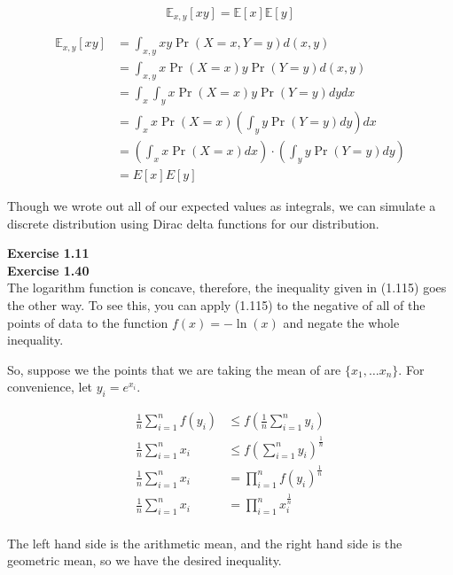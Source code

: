 \documentclass{article}
\newcommand{\E}{\mathbb{E}}
\begin{document}
\[
\E_{x,y} [xy] = \E[x]\E[y]
\]


\begin{align*}
\E_{x,y}[xy] &= \int_{x,y} xy \Pr(X=x,Y=y) d(x,y)\\
&= \int_{x,y} x \Pr(X=x) y \Pr(Y=y) d(x,y)\\
&= \int_x \int _y x \Pr(X=x) y \Pr(Y=y) dy dx \\
&= \int_x x \Pr(X=x) \left(\int _y  y \Pr(Y=y) dy\right) dx \\
&= \left(\int_x x \Pr(X=x) dx \right) \cdot \left(\int _y  y \Pr(Y=y) dy\right) \\
&= E[x] E[y]
\end{align*}

Though we wrote out all of our expected values as integrals, we can simulate a discrete distribution using Dirac delta functions for our distribution.

\noindent\textbf{Exercise 1.11}\\


\noindent\textbf{Exercise 1.40}\\

The logarithm function is concave, therefore, the inequality given in (1.115) goes the other way. To see this, you can apply (1.115) to the negative of all of the points of data to the function $f(x) = -\ln(x)$ and negate the whole inequality.

So, suppose we the points that we are taking the mean of are $\{x_1,\ldots x_n\}$. For convenience, let $y_i = e^{x_i}$.

\begin{align*}
\frac{1}{n}\sum_{i=1}^n f(y_i) &\le f( \frac{1}{n} \sum_{i=1}^n y_i) \\
\frac{1}{n}\sum_{i=1}^n x_i &\le f(  \sum_{i=1}^n y_i)^{\frac{1}{n}}\\
\frac{1}{n}\sum_{i=1}^n x_i &=\prod_{i=1}^n f(y_i)^{\frac{1}{n}}\\
\frac{1}{n}\sum_{i=1}^n x_i &=\prod_{i=1}^n x_i^{\frac{1}{n}}\\
\end{align*}

The left hand side is the arithmetic mean, and the right hand side is the geometric mean, so we have the desired inequality.
\end{document}
